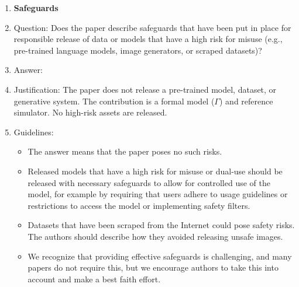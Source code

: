 \begin{enumerate}
\item {\bf Safeguards}
    \item[] Question: Does the paper describe safeguards that have been put in place for responsible release of data or models that have a high risk for misuse (e.g., pre-trained language models, image generators, or scraped datasets)?
    \item[] Answer: \answerNA{}
    \item[] Justification: The paper does not release a pre-trained model, dataset, or generative system. The contribution is a formal model ($\Gamma$) and reference simulator. No high-risk assets are released.
    \item[] Guidelines:
    \begin{itemize}
        \item The answer \answerNA{} means that the paper poses no such risks.
        \item Released models that have a high risk for misuse or dual-use should be released with necessary safeguards to allow for controlled use of the model, for example by requiring that users adhere to usage guidelines or restrictions to access the model or implementing safety filters. 
        \item Datasets that have been scraped from the Internet could pose safety risks. The authors should describe how they avoided releasing unsafe images.
        \item We recognize that providing effective safeguards is challenging, and many papers do not require this, but we encourage authors to take this into account and make a best faith effort.
    \end{itemize}


\end{enumerate}
